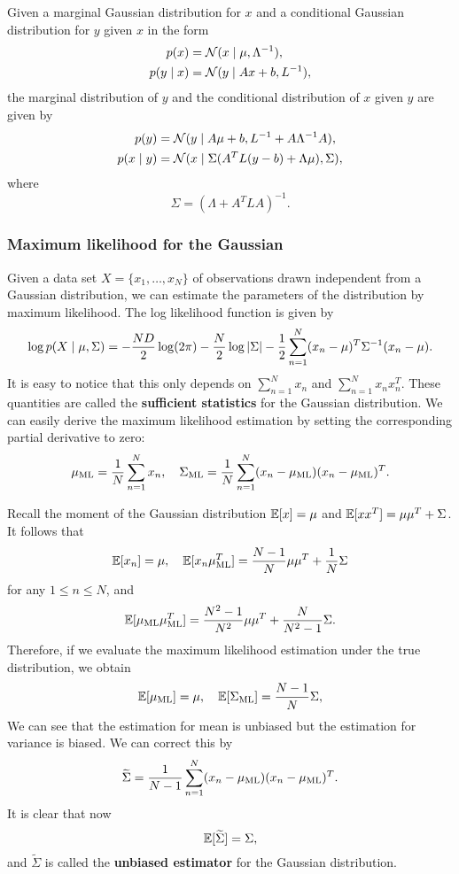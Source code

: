 \documentclass[a4paper]{article}
\begin{document}
\begin{thm}
Given a marginal Gaussian distribution for $x$ and a 
conditional Gaussian distribution for $y$ given $x$ in 
the form
\[
\begin{aligned}
p(x) &= \mathcal{N} (x \mid \mu, \Lambda^{-1}), \\
p(y \mid x) &= \mathcal{N} (y \mid A x + b, L^{-1}),
\end{aligned}
\]
the marginal distribution of $y$ and the conditional 
distribution of $x$ given $y$ are given by 
\[
\begin{aligned}
p(y) &= \mathcal{N} (y \mid A \mu + b, L^{-1} + A \Lambda^{-1} A), \\
p(x \mid y) &= \mathcal{N} (x \mid \Sigma (A^T L (y - b) + 
\Lambda \mu), \Sigma),
\end{aligned}
\]
where 
\[
\Sigma = (\Lambda + A^T L A)^{-1}.
\]
\end{thm}

\subsubsection{Maximum likelihood for the Gaussian}

Given a data set $X = \{x_1, \dots, x_N\}$ of observations 
drawn independent from a Gaussian distribution, we can 
estimate the parameters of the distribution by maximum 
likelihood. The log likelihood function is given by
\[
\log p(X \mid \mu, \Sigma)
= -\frac{N D}{2} \log (2 \pi) - \frac{N}{2} \log \left\lvert \Sigma\right\rvert
- \frac{1}{2} \sum_{n=1}^N (x_n - \mu)^T \Sigma^{-1} 
(x_n - \mu).
\]
It is easy to notice that this only depends on $\sum_{n=1}^N 
x_n$ and $\sum_{n=1}^N x_n x_n^T$. These quantities are 
called the \textbf{sufficient statistics} for the Gaussian 
distribution. We can easily 
derive the maximum likelihood estimation by setting the
corresponding partial derivative to zero: 
\[
\mu_{\text{ML}} = \frac{1}{N} \sum_{n=1}^N x_n, 
\quad 
\Sigma_{\text{ML}} = \frac{1}{N} \sum_{n=1}^N 
(x_n - \mu_{\text{ML}}) (x_n - \mu_{\text{ML}})^T.
\]

Recall the moment of the Gaussian distribution 
$\mathbb{E}[x] = \mu$ and $\mathbb{E}[x x^T] = \mu \mu^T + \Sigma$.
It follows that 
\[
\begin{aligned}
\mathbb{E}[x_n] = \mu, 
\quad 
\mathbb{E}[x_n \mu_{\text{ML}}^T] 
= \frac{N - 1}{N} \mu \mu^T + \frac{1}{N} \Sigma
\end{aligned}
\]
for any $1 \leq n \leq N$, and 
\[
\mathbb{E}[\mu_{\text{ML}} \mu_{\text{ML}}^T]
= \frac{N^2 - 1}{N^2} \mu \mu^T 
+ \frac{N}{N^2 - 1} \Sigma.
\]
Therefore, if we evaluate the maximum likelihood estimation 
under the true distribution, we obtain
\[
\mathbb{E}[\mu_{\text{ML}}] = \mu,
\quad 
\mathbb{E}[\Sigma_{\text{ML}}] = \frac{N - 1}{N} \Sigma,
\]
We can see that the estimation for mean is unbiased but the 
estimation for variance is biased. We can correct this 
by 
\[
\widetilde{\Sigma} = \frac{1}{N - 1} \sum_{n=1}^N 
(x_n - \mu_{\text{ML}}) (x_n - \mu_{\text{ML}})^T.
\]
It is clear that now 
\[
\mathbb{E}[\widetilde{\Sigma}] = \Sigma,
\]
and $\tilde{\Sigma}$ is called the \textbf{unbiased 
estimator} for the Gaussian distribution.
\end{document}
